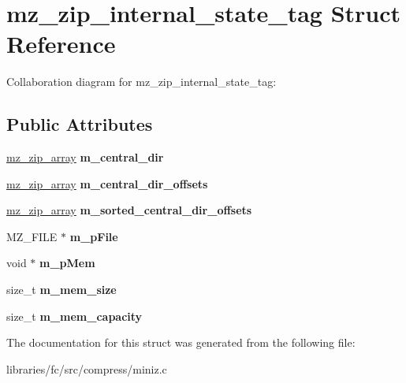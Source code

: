 \hypertarget{structmz__zip__internal__state__tag}{}\section{mz\+\_\+zip\+\_\+internal\+\_\+state\+\_\+tag Struct Reference}
\label{structmz__zip__internal__state__tag}


Collaboration diagram for mz\+\_\+zip\+\_\+internal\+\_\+state\+\_\+tag\+:
\subsection*{Public Attributes}
\begin{DoxyCompactItemize}
\item 
\mbox{\label{structmz__zip__internal__state__tag_a67c1dde93587443d48ae4c54fb32757f}} 
\mbox{\hyperlink{structmz__zip__array}{mz\+\_\+zip\+\_\+array}} {\bfseries m\+\_\+central\+\_\+dir}
\item 
\mbox{\label{structmz__zip__internal__state__tag_a51a9aa41f7499c7e6e4c2546aa965b9c}} 
\mbox{\hyperlink{structmz__zip__array}{mz\+\_\+zip\+\_\+array}} {\bfseries m\+\_\+central\+\_\+dir\+\_\+offsets}
\item 
\mbox{\label{structmz__zip__internal__state__tag_a1e3af54224b61cb20d6ceaeb5807bc33}} 
\mbox{\hyperlink{structmz__zip__array}{mz\+\_\+zip\+\_\+array}} {\bfseries m\+\_\+sorted\+\_\+central\+\_\+dir\+\_\+offsets}
\item 
\mbox{\label{structmz__zip__internal__state__tag_a983d6519b4721e4fff03f5c5d2908972}} 
M\+Z\+\_\+\+F\+I\+LE $\ast$ {\bfseries m\+\_\+p\+File}
\item 
\mbox{\label{structmz__zip__internal__state__tag_ac0f2149f384cffd332635b3a5323c377}} 
void $\ast$ {\bfseries m\+\_\+p\+Mem}
\item 
\mbox{\label{structmz__zip__internal__state__tag_a4511d7743e1a63fb78ed066f8de96466}} 
size\+\_\+t {\bfseries m\+\_\+mem\+\_\+size}
\item 
\mbox{\label{structmz__zip__internal__state__tag_a71f011527805e3ac48f5f12cb73d2233}} 
size\+\_\+t {\bfseries m\+\_\+mem\+\_\+capacity}
\end{DoxyCompactItemize}


The documentation for this struct was generated from the following file\+:\begin{DoxyCompactItemize}
\item 
libraries/fc/src/compress/miniz.\+c\end{DoxyCompactItemize}
